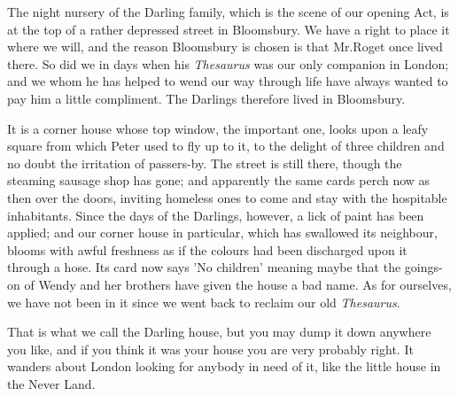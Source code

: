 

\begin{stagedir}
The night nursery of the Darling family,
which is the scene of our opening Act,
is at the top of a rather depressed street in Bloomsbury.
We have a right to place it where we will,
and the reason Bloomsbury is chosen is that Mr.\@ Roget once lived there.
So did we in days when his \emph{Thesaurus} was our only companion in London;
and we whom he has helped to wend our way through life
have always wanted to pay him a little compliment.
The Darlings therefore lived in Bloomsbury.

It is a corner house whose top window, the important one,
looks upon a leafy square from which Peter used to fly up to it,
to the delight of three children and no doubt the irritation of passers-by.
The street is still there, though the steaming sausage shop has gone;
and apparently the same cards perch now as then over the doors,
inviting homeless ones to come and stay with the hospitable inhabitants.
Since the days of the Darlings, however, a lick of paint has been applied;
and our corner house in particular, which has swallowed its neighbour,
blooms with awful freshness as if the colours had been discharged upon it through a hose.
Its card now says 'No children'
meaning maybe that the goings-on of Wendy and her brothers have given the house a bad name.
As for ourselves, we have not been in it since we went back to reclaim our old \emph{Thesaurus}.

That is what we call the Darling house,
but you may dump it down anywhere you like, and if you think it was your house you are very probably right.
It wanders about London looking for anybody in need of it, like the little house in the Never Land.


\end{stagedir}
